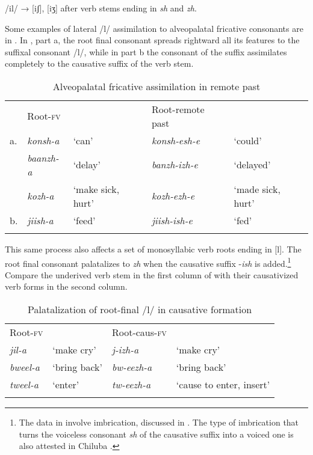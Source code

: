 \documentclass[output=paper]{langsci/langscibook}
\begin{document}
\ea
\label{ex:3.kawasha}
/il/ → [iʃ], [iʒ] after verb stems ending in \textit{sh} and \textit{zh}.
\z

Some examples of lateral /l/ assimilation to alveopalatal fricative consonants are in . In , part a, the root final consonant spreads rightward all its features to the suffixal consonant /l/, while in part b the consonant of the suffix assimilates completely to the causative suffix of the verb stem. 

\begin{table}
\begin{tabular}{lllll}
\lsptoprule
 & Root-\textsc{fv} &  & Root-remote past & \\
a. & \textit{konsh-a} & `can' & \textit{konsh-esh-e} & `could' \\
 & \textit{baanzh-a} & `delay' & \textit{banzh-izh-e} & `delayed' \\
 & \textit{kozh-a} & `make sick, hurt' & \textit{kozh-ezh-e} & `made sick, hurt' \\
b. & \textit{jiish-a} & `feed' & \textit{jiish-ish-e} & `fed' \\

\lspbottomrule
\end{tabular}

\caption{Alveopalatal fricative assimilation in remote past}
\label{tab:5.kawasha}

\end{table}


This same process also affects a set of monosyllabic verb roots ending in [l]. The root final consonant palatalizes to \textit{zh} when the causative suffix -\textit{ish} is added.\footnote{The data in  involve imbrication, discussed in . The type of imbrication that turns the voiceless consonant \textit{sh} of the causative suffix into a voiced one is also attested in Chiluba \citep[73]{lukusa1993}.} Compare the underived verb stem in the first column of  with their causativized verb forms in the second column.

\begin{table}
\begin{tabular}{llll}
\lsptoprule
  Root-\textsc{fv} &  &   Root-caus-\textsc{fv} & \\
\textit{jil-a} & `make cry' & \textit{j-izh-a} & `make cry' \\
\textit{bweel-a} & `bring back' & \textit{bw-eezh-a} & `bring back' \\
\textit{tweel-a} & `enter' & \textit{tw-eezh-a} & `cause to enter, insert' \\

\lspbottomrule
\end{tabular}

\caption{Palatalization of root-final /l/ in causative formation}
\label{tab:6.kawasha}

 \end{table}
\end{document}
